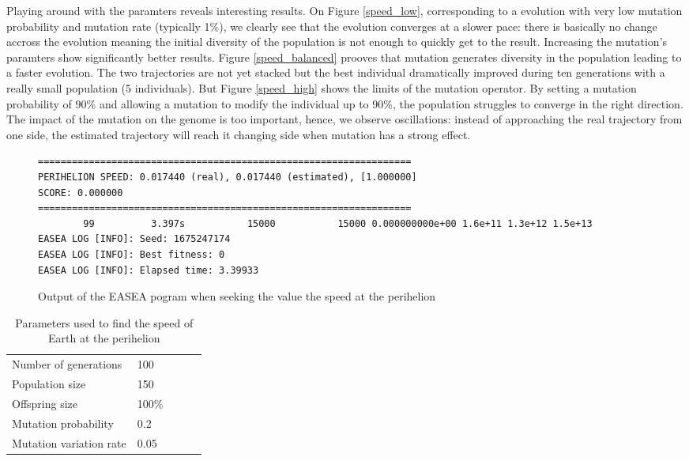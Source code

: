 Playing around with the paramters reveals interesting results. On Figure
\ref{speed_low}, corresponding to a evolution with very low mutation
probability and mutation rate (typically 1\%), we clearly see that the
evolution
converges at a slower pace: there is basically no change accross the evolution
meaning the initial diversity of the population is not enough to quickly get to
the result. Increasing the mutation's paramters show significantly better
results. Figure \ref{speed_balanced} prooves that mutation generates diversity
in the population leading to a faster evolution. The two trajectories are not
yet stacked but the best individual dramatically improved during ten
generations with a really small population (5 individuals). But Figure
\ref{speed_high} shows the limits of the mutation operator. By setting a
mutation probability of 90\% and allowing a mutation to modify the individual
up to 90\%, the population struggles to converge in the right direction. The
impact of the mutation on the genome is too important, hence, we observe
oscillations: instead of approaching the real trajectory from one side, the
estimated trajectory will reach it changing side when mutation has a strong
effect.

\begin{figure}
    \begin{lstlisting}
==================================================================
PERIHELION SPEED: 0.017440 (real), 0.017440 (estimated), [1.000000]
SCORE: 0.000000
==================================================================
        99          3.397s           15000           15000 0.000000000e+00 1.6e+11 1.3e+12 1.5e+13
EASEA LOG [INFO]: Seed: 1675247174
EASEA LOG [INFO]: Best fitness: 0
EASEA LOG [INFO]: Elapsed time: 3.39933
\end{lstlisting}
    \caption{Output of the EASEA pogram when seeking the value the speed at the perihelion}
    \label{speed_1}
\end{figure}

\begin{table}
    \begin{tabular}{lllll}
        Number of generations   & 100   \\
        Population size         & 150   \\
        Offspring size          & 100\% \\
        Mutation probability    & 0.2   \\
        Mutation variation rate & 0.05
    \end{tabular}
    \caption{Parameters used to find the speed of Earth at the perihelion}
    \label{speed_table}
\end{table}


